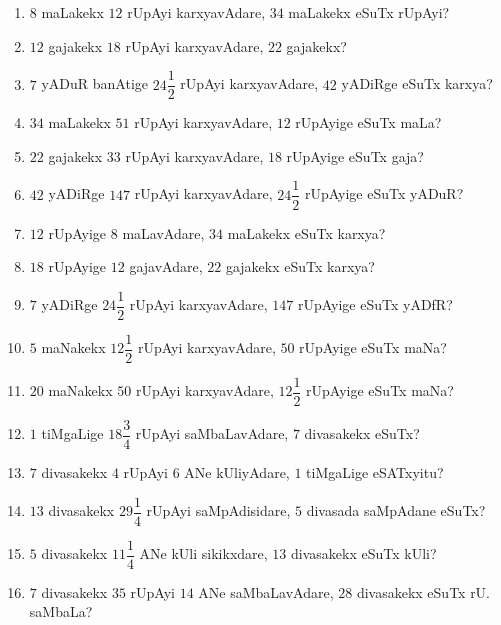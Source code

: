 \begin{enumerate}[\rm (1)]
\item $8$ maLakekx $12$ rUpAyi karxyavAdare, $34$ maLakekx eSuTx rUpAyi?

\item $12$ gajakekx $18$ rUpAyi karxyavAdare, $22$ gajakekx?

\item $7$ yADuR banAtige $24\dfrac{1}{2}$ rUpAyi karxyavAdare, $42$ yADiRge eSuTx karxya?

\item $34$ maLakekx $51$ rUpAyi karxyavAdare, $12$ rUpAyige eSuTx maLa?

\item $22$ gajakekx $33$ rUpAyi karxyavAdare, $18$ rUpAyige eSuTx gaja?

\item $42$ yADiRge $147$ rUpAyi karxyavAdare, $24\dfrac{1}{2}$ rUpAyige eSuTx yADuR?

\item $12$ rUpAyige $8$ maLavAdare, $34$ maLakekx eSuTx karxya?

\item $18$ rUpAyige $12$ gajavAdare, $22$ gajakekx eSuTx karxya?

\item $7$ yADiRge $24\dfrac{1}{2}$ rUpAyi karxyavAdare, $147$ rUpAyige eSuTx yADfR?

\item $5$ maNakekx $12\dfrac{1}{2}$ rUpAyi karxyavAdare, $50$ rUpAyige eSuTx maNa?

\item $20$ maNakekx $50$ rUpAyi karxyavAdare, $12\dfrac{1}{2}$ rUpAyige eSuTx maNa?

\item $1$ tiMgaLige $18\dfrac{3}{4}$ rUpAyi saMbaLavAdare, $7$ divasakekx eSuTx?

\item $7$ divasakekx $4$ rUpAyi $6$ ANe kUliyAdare, $1$ tiMgaLige eSATxyitu?

\item $13$ divasakekx $29\dfrac{1}{4}$ rUpAyi saMpAdisidare, $5$ divasada saMpAdane eSuTx?

\item $5$ divasakekx $11\dfrac{1}{4}$ ANe kUli sikikxdare, $13$ divasakekx eSuTx kUli?

\item $7$ divasakekx $35$ rUpAyi $14$ ANe saMbaLavAdare, $28$ divasakekx eSuTx rU. saMbaLa?


\end{enumerate}
